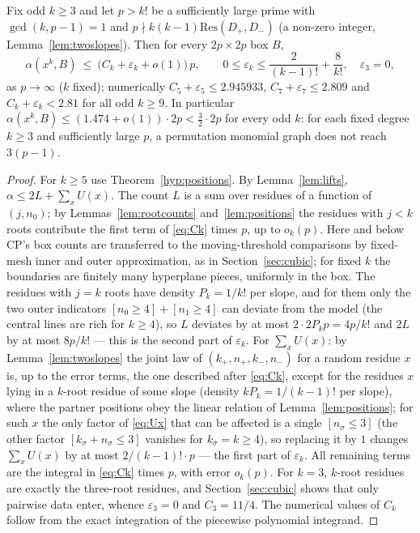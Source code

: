 \begin{theorem}\label{thm:perm}
Fix odd $k\ge3$ and let $p>k!$ be a sufficiently large prime with $\gcd(k,p-1)=1$ and $p\nmid k(k-1)\mathrm{Res}(D_+,D_-)$ (a non-zero integer, Lemma~\ref{lem:twoslopes}).
Then for every $2p\times2p$ box $B$,
\[
 \alpha(x^k,B)\ \le\ \bigl(C_k+\varepsilon_k+o(1)\bigr)\,p,\qquad 0\le\varepsilon_k\le\frac2{(k-1)!}+\frac8{k!},\quad \varepsilon_3=0,
\]
as $p\to\infty$ ($k$ fixed); numerically $C_5+\varepsilon_5\le2.945933$, $C_7+\varepsilon_7\le2.809$ and $C_k+\varepsilon_k<2.81$ for all odd $k\ge9$.  In particular
$\alpha(x^k,B)\le(1.474+o(1))\cdot2p<\tfrac32\cdot2p$ for every odd $k$: for each fixed degree $k\ge3$ and sufficiently large $p$, a permutation monomial graph does not reach $3(p-1)$.
\end{theorem}
\begin{proof}
For $k\ge5$ use Theorem~\ref{hyp:positions}.  By Lemma~\ref{lem:lifts}, $\alpha\le2L+\sum_xU(x)$.  The count $L$ is a sum over residues of a function of $(j,n_0)$; by Lemmas~\ref{lem:rootcounts}
and~\ref{lem:positions} the residues with $j<k$ roots contribute the first term of \eqref{eq:Ck} times $p$, up to $o_k(p)$.
Here and below CP's box counts are transferred to the moving-threshold comparisons by fixed-mesh inner and outer approximation,
as in Section~\ref{sec:cubic}; for fixed $k$ the boundaries are finitely many hyperplane pieces, uniformly in the box.
The residues
with $j=k$ roots have density $P_k=1/k!$ per slope, and for them only the two outer indicators $[n_0\ge4]+[n_1\ge4]$ can deviate from the model
(the central lines are rich for $k\ge4$), so $L$ deviates by at most $2\cdot2P_kp=4p/k!$ and $2L$ by at most $8p/k!$ — this is the second part of
$\varepsilon_k$.  For $\sum_xU(x)$: by Lemma~\ref{lem:twoslopes} the joint law of $(k_+,n_+,k_-,n_-)$ for a random residue $x$ is, up to the error terms, the
one described after \eqref{eq:Ck}, except for the residues $x$ lying in a $k$-root residue of some slope (density $kP_k=1/(k-1)!$ per slope), where the
partner positions obey the linear relation of Lemma~\ref{lem:positions}; for such $x$ the only factor of \eqref{eq:Ux} that can be affected is a single
$[n_\sigma\le3]$ (the other factor $[k_\sigma+n_\sigma\le3]$ vanishes for $k_\sigma=k\ge4$), so replacing it by $1$ changes $\sum_xU(x)$ by at most
$2/(k-1)!\cdot p$ — the first part of $\varepsilon_k$.  All remaining terms are the integral in \eqref{eq:Ck} times $p$, with error $o_k(p)$.
For $k=3$, $k$-root residues are exactly the three-root residues, and Section~\ref{sec:cubic} shows that only pairwise data enter, whence $\varepsilon_3=0$
and $C_3=11/4$.  The numerical values of $C_k$ follow from the exact integration of the piecewise polynomial integrand.
\end{proof}

